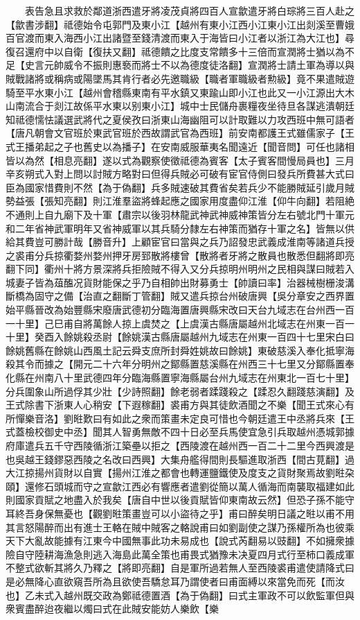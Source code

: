 　　表告急且求救於鄰道浙西遣牙將凌茂貞將四百人宣歙遣牙將白琮將三百人赴之【歙書涉翻】祗德始令屯郭門及東小江【越州有東小江西小江東小江出剡溪至曹娥百官渡而東入海西小江出諸暨至錢清渡而東入于海皆曰小江者以浙江為大江也】尋復召還府中以自衛【復扶又翻】祗德饋之比度支常饋多十三倍而宣潤將士猶以為不足【史言元帥威令不振則惠䙝而將士不以為德度徒洛翻】宣潤將士請土軍為導以與賊戰諸將或稱病或陽墜馬其肯行者必先邀職級【職者軍職級者勲級】竟不果遣賊遊騎至平水東小江【越州會稽縣東南有平水鎮又東踰山即小江也此又一小江源出大木山南流合于剡江故係平水東以别東小江】城中士民儲舟裹糧夜坐待旦各謀逃潰朝廷知祗德懦怯議選武將代之夏侯孜曰浙東山海幽阻可以計取難以力攻西班中無可語者【唐凡朝會文官班於東武官班於西故謂武官為西班】前安南都護王式雖儒家子【王式王播弟起之子也舊史以為播子】在安南威服華夷名聞遠近【聞音問】可任也諸相皆以為然【相息亮翻】遂以式為觀察使徵祗德為賓客【太子賓客間慢局員也】三月辛亥朔式入對上問以討賊方略對曰但得兵賊必可破有宦官侍側曰發兵所費甚大式曰臣為國家惜費則不然【為于偽翻】兵多賊速破其費省矣若兵少不能勝賊延引歲月賊勢益張【張知亮翻】則江淮羣盜將蜂起應之國家用度盡仰江淮【仰牛向翻】若阻絶不通則上自九廟下及十軍【肅宗以後羽林龍武神武神威神策皆分左右號北門十軍元和二年省神武軍明年又省神威軍以其兵騎分隸左右神策而猶存十軍之名】皆無以供給其費豈可勝計哉【勝音升】上顧宦官曰當與之兵乃詔發忠武義成淮南等諸道兵授之裘甫分兵掠衢婺州婺州押牙房郅散將樓曾【散將者牙將之散員也散悉但翻將即亮翻下同】衢州十將方景深將兵拒險賊不得入又分兵掠明州明州之民相與謀曰賊若入城妻子皆為葅醢况貨財能保之乎乃自相帥出財募勇士【帥讀曰率】治器械樹栅浚溝斷橋為固守之備【治直之翻斷丁管翻】賊又遣兵掠台州破唐興【吳分章安之西界置始平縣晉改為始豐縣宋廢唐武德初分臨海置唐興縣宋改曰天台九域志在台州西一百一十里】己巳甫自將萬餘人掠上虞焚之【上虞漢古縣唐屬越州北域志在州東一百一十里】癸酉入餘姚殺丞尉【餘姚漢古縣唐屬越州九域志在州東一百四十七里宋白曰餘姚舊縣在餘姚山西風土記云舜支庶所封舜姓姚故曰餘姚】東破慈溪入奉化抵寧海殺其令而據之【開元二十六年分明州之鄮縣置慈溪縣在州西三十七里又分鄮縣置奉化縣在州南八十里武德四年分臨海縣置寧海縣屬台州九域志在州東北一百七十里】分兵圍象山所過俘其少壯【少詩照翻】餘老弱者蹂踐殺之【蹂忍久翻踐慈演翻】及王式除書下浙東人心稍安【下遐稼翻】裘甫方與其徒飲酒聞之不樂【聞王式來心有所憚樂音洛】劉暀歎曰有如此之衆而策畫未定良可惜也今朝廷遣王中丞將兵來【王式蓋檢校御史中丞】聞其人智勇無敵不四十日必至兵馬使宜急引兵取越州憑城郭據府庫遣兵五千守西陵循浙江築壘以拒之【西陵渡在越州西一百二十二里今西興渡是也吳越王錢鏐惡西陵之名改曰西興】大集舟艦得間則長驅進取浙西【間古莧翻】過大江掠揚州貨財以自實【揚州江淮之都會也轉運鹽鐵使及度支之貨財聚焉故劉暀朶頤】還修石頭城而守之宣歙江西必有響應者遣劉從簡以萬人循海而南襲取福建如此則國家貢賦之地盡入於我矣【唐自中世以後貢賦皆仰東南故云然】但恐子孫不能守耳終吾身保無憂也【觀劉暀策畫豈可以小盜待之乎】甫曰醉矣明日議之暀以甫不用其言怒陽醉而出有進士王輅在賊中賊客之輅說甫曰如劉副使之謀乃孫權所為也彼乘天下大亂故能據有江東今中國無事此功未易成也【說式芮翻易以豉翻】不如擁衆據險自守陸耕海漁急則逃入海島此萬全策也甫畏式猶豫未决夏四月式行至柿口義成軍不整式欲斬其將久乃釋之【將即亮翻】自是軍所過若無人至西陵裘甫遣使請降式曰是必無降心直欲窺吾所為且欲使吾驕怠耳乃謂使者曰甫面縛以來當免而死【而汝也】乙未式入越州既交政為鄭祗德置酒【為于偽翻】曰式主軍政不可以飲監軍但與衆賓盡醉迨夜繼以燭曰式在此賊安能妨人樂飲【樂